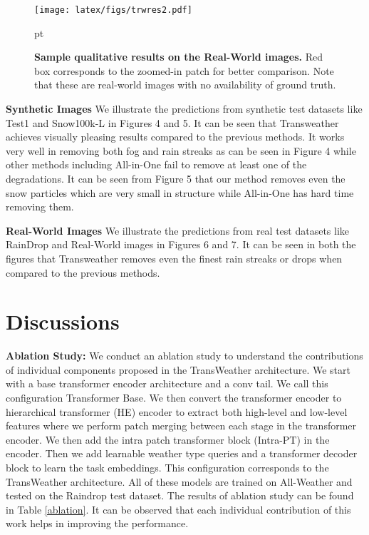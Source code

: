 \documentclass[10pt,twocolumn,letterpaper]{article}
\begin{document}
\begin{figure*}[]
	\centering
	\texttt{[image: latex/figs/trwres2.pdf]} 
	
	 pt
	\caption{\textbf{Sample qualitative results on the Real-World images.}  Red box corresponds to the zoomed-in patch for better comparison. Note that these are real-world images with no availability of ground truth. \label{real} 
	}
	\vspace{-2em}
\end{figure*}









		










		




\noindent \textbf{Synthetic Images} We illustrate the predictions from synthetic test datasets like Test1 and Snow100k-L in Figures 4 and 5. It can be seen that Transweather achieves visually pleasing results compared to the previous methods. It works very well in removing both fog and rain streaks as can be seen in Figure  4   while other methods including All-in-One fail to remove at least one of the degradations.  It can be seen from Figure 5 that our method removes even the snow particles which are very small in structure while All-in-One has hard time removing them.


\noindent \textbf{Real-World Images} We illustrate the predictions from real test datasets like RainDrop and Real-World images in Figures 6 and 7. It can be seen in both the figures that Transweather removes even the finest rain streaks or drops when compared to the previous methods. 


\section{Discussions}

\noindent \textbf{Ablation Study:} We conduct an ablation study to understand the contributions of individual components proposed in the  TransWeather architecture. We start with a base transformer encoder architecture and a conv tail. We call this configuration Transformer Base. We then convert the transformer encoder to hierarchical transformer (HE) encoder to extract both high-level and low-level features where we perform patch merging between each stage in the transformer encoder. We then add the intra patch transformer block (Intra-PT) in the encoder. Then we add learnable weather type queries and a transformer decoder block to learn the task embeddings. This configuration corresponds to the TransWeather architecture. All of these models are trained on All-Weather and tested on the Raindrop test dataset. The results of ablation study can be found in Table \ref{ablation}. It can be observed that each individual contribution of this work helps in improving the performance.
\end{document}
